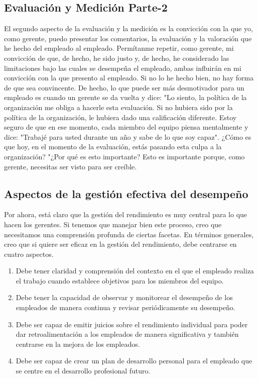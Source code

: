 \documentclass[10pt]{book}
\begin{document}
\subsection{Evaluación y Medición Parte-2}
El segundo aspecto de la evaluación y la medición es la convicción con la que yo, como gerente, puedo presentar los comentarios, la evaluación y la valoración que he hecho del empleado al empleado. Permítanme repetir, como gerente, mi convicción de que, de hecho, he sido justo y, de hecho, he considerado las limitaciones bajo las cuales se desempeña el empleado, ambas influirán en mi convicción con la que presento al empleado. Si no lo he hecho bien, no hay forma de que sea convincente. De hecho, lo que puede ser más desmotivador para un empleado es cuando un gerente se da vuelta y dice: "Lo siento, la política de la organización me obliga a hacerle esta evaluación. Si no hubiera sido por la política de la organización, le hubiera dado una calificación diferente. Estoy seguro de que en ese momento, cada miembro del equipo piensa mentalmente y dice: "Trabajé para usted durante un año y sabe de lo que soy capaz". ¿Cómo es que hoy, en el momento de la evaluación, estás pasando esta culpa a la organización? "¿Por qué es esto importante? Esto es importante porque, como gerente, necesitas ser visto para ser creíble.
\subsection{Aspectos de la gestión efectiva del desempeño}
Por ahora, está claro que la gestión del rendimiento es muy central para lo que hacen los gerentes. Si tenemos que manejar bien este proceso, creo que necesitamos una comprensión profunda de ciertas facetas. En términos generales, creo que si quiere ser eficaz en la gestión del rendimiento, debe centrarse en cuatro aspectos. 
\begin{enumerate}[\bfseries 1.]
\item Debe tener claridad y comprensión del contexto en el que el empleado realiza el trabajo cuando establece objetivos para los miembros del equipo.
\item Debe tener la capacidad de observar y monitorear el desempeño de los empleados de manera continua y revisar periódicamente su desempeño.
\item Debe ser capaz de emitir juicios sobre el rendimiento individual para poder dar retroalimentación a los empleados de manera significativa y también centrarse en la mejora de los empleados.
\item Debe ser capaz de crear un plan de desarrollo personal para el empleado que se centre en el desarrollo profesional futuro.
\end{enumerate}
\end{document}
